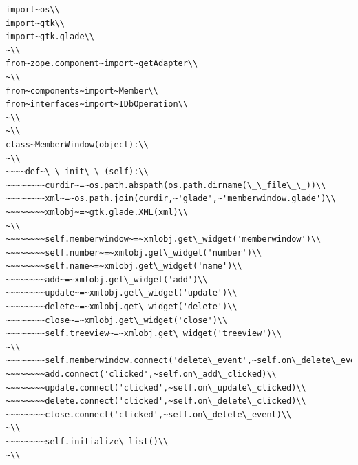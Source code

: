 \documentclass[a4paper,openany,twoside,draft]{book}
\begin{document}
\begin{verbatim}
import~os\\
import~gtk\\
import~gtk.glade\\
~\\
from~zope.component~import~getAdapter\\
~\\
from~components~import~Member\\
from~interfaces~import~IDbOperation\\
~\\
~\\
class~MemberWindow(object):\\
~\\
~~~~def~\_\_init\_\_(self):\\
~~~~~~~~curdir~=~os.path.abspath(os.path.dirname(\_\_file\_\_))\\
~~~~~~~~xml~=~os.path.join(curdir,~'glade',~'memberwindow.glade')\\
~~~~~~~~xmlobj~=~gtk.glade.XML(xml)\\
~\\
~~~~~~~~self.memberwindow~=~xmlobj.get\_widget('memberwindow')\\
~~~~~~~~self.number~=~xmlobj.get\_widget('number')\\
~~~~~~~~self.name~=~xmlobj.get\_widget('name')\\
~~~~~~~~add~=~xmlobj.get\_widget('add')\\
~~~~~~~~update~=~xmlobj.get\_widget('update')\\
~~~~~~~~delete~=~xmlobj.get\_widget('delete')\\
~~~~~~~~close~=~xmlobj.get\_widget('close')\\
~~~~~~~~self.treeview~=~xmlobj.get\_widget('treeview')\\
~\\
~~~~~~~~self.memberwindow.connect('delete\_event',~self.on\_delete\_event)\\
~~~~~~~~add.connect('clicked',~self.on\_add\_clicked)\\
~~~~~~~~update.connect('clicked',~self.on\_update\_clicked)\\
~~~~~~~~delete.connect('clicked',~self.on\_delete\_clicked)\\
~~~~~~~~close.connect('clicked',~self.on\_delete\_event)\\
~\\
~~~~~~~~self.initialize\_list()\\
~\\

\end{verbatim}
\end{document}
